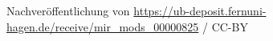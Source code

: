 Nachveröffentlichung von
\url{https://ub-deposit.fernuni-hagen.de/receive/mir_mods_00000825} /
CC-BY
